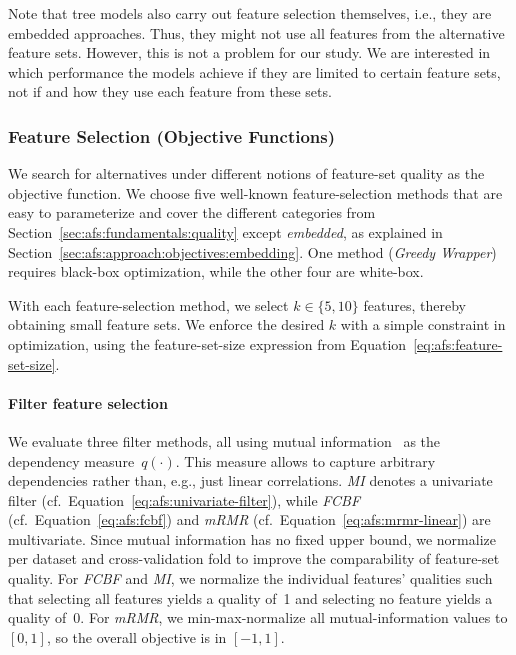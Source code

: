 \documentclass{article}
\theoremstyle{definition}
\begin{document}
Note that tree models also carry out feature selection themselves, i.e., they are embedded approaches.
Thus, they might not use all features from the alternative feature sets.
However, this is not a problem for our study.
We are interested in which performance the models achieve if they are limited to certain feature sets, not if and how they use each feature from these sets.

\subsubsection{Feature Selection (Objective Functions)}
\label{sec:afs:experimental-design:approaches:feature-selection}

We search for alternatives under different notions of feature-set quality as the objective function.
We choose five well-known feature-selection methods that are easy to parameterize and cover the different categories from Section~\ref{sec:afs:fundamentals:quality} except \emph{embedded}, as explained in Section~\ref{sec:afs:approach:objectives:embedding}.
One method (\emph{Greedy Wrapper}) requires black-box optimization, while the other four are white-box.

With each feature-selection method, we select $k \in \{5,10\}$ features, thereby obtaining small feature sets.
We enforce the desired $k$ with a simple constraint in optimization, using the feature-set-size expression from Equation~\ref{eq:afs:feature-set-size}.

\paragraph{Filter feature selection}

We evaluate three filter methods, all using mutual information~\cite{kraskov2004estimating} as the dependency measure~$q(\cdot)$.
This measure allows to capture arbitrary dependencies rather than, e.g., just linear correlations.
\emph{MI} denotes a univariate filter (cf.~Equation~\ref{eq:afs:univariate-filter}), while \emph{FCBF} (cf.~Equation~\ref{eq:afs:fcbf}) and \emph{mRMR} (cf.~Equation~\ref{eq:afs:mrmr-linear}) are multivariate.
Since mutual information has no fixed upper bound, we normalize per dataset and cross-validation fold to improve the comparability of feature-set quality.
For \emph{FCBF} and \emph{MI}, we normalize the individual features' qualities such that selecting all features yields a quality of~1 and selecting no feature yields a quality of~0.
For \emph{mRMR}, we min-max-normalize all mutual-information values to $[0,1]$, so the overall objective is in $[-1,1]$.
\end{document}
